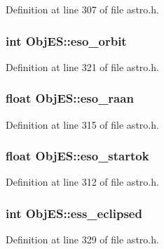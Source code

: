 Definition at line 307 of file astro.\-h.

\hypertarget{struct_obj_e_s_a5447658f274c3195b450ee8ba9249590}{
\subsubsection[{eso\-\_\-orbit}]{\setlength{\rightskip}{0pt plus 5cm}int Obj\-E\-S\-::eso\-\_\-orbit}}\label{struct_obj_e_s_a5447658f274c3195b450ee8ba9249590}


Definition at line 321 of file astro.\-h.

\hypertarget{struct_obj_e_s_a2706cc4697ba62259e2c8d0a5355d983}{
\subsubsection[{eso\-\_\-raan}]{\setlength{\rightskip}{0pt plus 5cm}float Obj\-E\-S\-::eso\-\_\-raan}}\label{struct_obj_e_s_a2706cc4697ba62259e2c8d0a5355d983}


Definition at line 315 of file astro.\-h.

\hypertarget{struct_obj_e_s_ac838c1e7532b7f21df767d8592dcfc08}{
\subsubsection[{eso\-\_\-startok}]{\setlength{\rightskip}{0pt plus 5cm}float Obj\-E\-S\-::eso\-\_\-startok}}\label{struct_obj_e_s_ac838c1e7532b7f21df767d8592dcfc08}


Definition at line 312 of file astro.\-h.

\hypertarget{struct_obj_e_s_ac6d7c45b158ba372b583c2fe679f87f9}{
\subsubsection[{ess\-\_\-eclipsed}]{\setlength{\rightskip}{0pt plus 5cm}int Obj\-E\-S\-::ess\-\_\-eclipsed}}\label{struct_obj_e_s_ac6d7c45b158ba372b583c2fe679f87f9}


Definition at line 329 of file astro.\-h.

